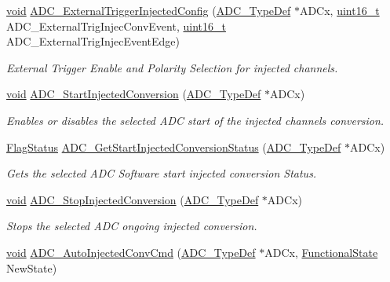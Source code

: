 \begin{DoxyCompactItemize}
\hyperlink{group___n_a_m_e_ga18028b8badbf1ea7e704ccac3c488e82}{void} \hyperlink{group___a_d_c___exported___constants_gabe8b7c5f81fe735c942612af3c2a6279}{A\-D\-C\-\_\-\-External\-Trigger\-Injected\-Config} (\hyperlink{struct_a_d_c___type_def}{A\-D\-C\-\_\-\-Type\-Def} $\ast$A\-D\-Cx, \hyperlink{stdint_8h_a273cf69d639a59973b6019625df33e30}{uint16\-\_\-t} A\-D\-C\-\_\-\-External\-Trig\-Injec\-Conv\-Event, \hyperlink{stdint_8h_a273cf69d639a59973b6019625df33e30}{uint16\-\_\-t} A\-D\-C\-\_\-\-External\-Trig\-Injec\-Event\-Edge)
\begin{DoxyCompactList}\small\item\em External Trigger Enable and Polarity Selection for injected channels. \end{DoxyCompactList}\item 
\hyperlink{group___n_a_m_e_ga18028b8badbf1ea7e704ccac3c488e82}{void} \hyperlink{group___a_d_c___exported___constants_ga247e283c7c37f4eff3c0b8515cd03b52}{A\-D\-C\-\_\-\-Start\-Injected\-Conversion} (\hyperlink{struct_a_d_c___type_def}{A\-D\-C\-\_\-\-Type\-Def} $\ast$A\-D\-Cx)
\begin{DoxyCompactList}\small\item\em Enables or disables the selected A\-D\-C start of the injected channels conversion. \end{DoxyCompactList}\item 
\hyperlink{group___exported__types_ga89136caac2e14c55151f527ac02daaff}{Flag\-Status} \hyperlink{group___a_d_c___exported___constants_gad1e5ddd2f0456e50d8d8f6db2bffef3d}{A\-D\-C\-\_\-\-Get\-Start\-Injected\-Conversion\-Status} (\hyperlink{struct_a_d_c___type_def}{A\-D\-C\-\_\-\-Type\-Def} $\ast$A\-D\-Cx)
\begin{DoxyCompactList}\small\item\em Gets the selected A\-D\-C Software start injected conversion Status. \end{DoxyCompactList}\item 
\hyperlink{group___n_a_m_e_ga18028b8badbf1ea7e704ccac3c488e82}{void} \hyperlink{group___a_d_c___exported___constants_gaa5c10c22746b504d4e0de659098b0fe0}{A\-D\-C\-\_\-\-Stop\-Injected\-Conversion} (\hyperlink{struct_a_d_c___type_def}{A\-D\-C\-\_\-\-Type\-Def} $\ast$A\-D\-Cx)
\begin{DoxyCompactList}\small\item\em Stops the selected A\-D\-C ongoing injected conversion. \end{DoxyCompactList}\item 
\hyperlink{group___n_a_m_e_ga18028b8badbf1ea7e704ccac3c488e82}{void} \hyperlink{group___a_d_c___exported___constants_ga1ff9c3b8e4bbdd2addfd227f1a506a66}{A\-D\-C\-\_\-\-Auto\-Injected\-Conv\-Cmd} (\hyperlink{struct_a_d_c___type_def}{A\-D\-C\-\_\-\-Type\-Def} $\ast$A\-D\-Cx, \hyperlink{group___exported__types_gac9a7e9a35d2513ec15c3b537aaa4fba1}{Functional\-State} New\-State)

\end{DoxyCompactItemize}
